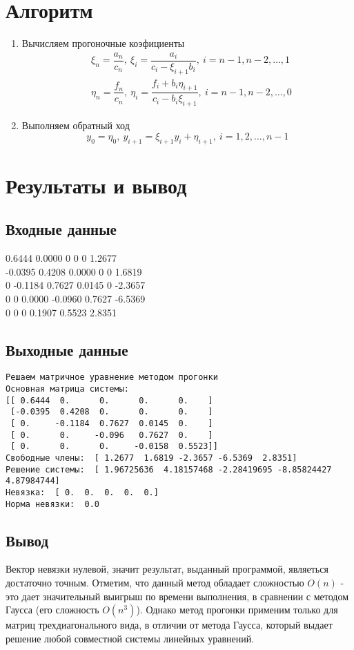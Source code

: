 \documentclass[11.4pt]{article}
\begin{document}
\section{Алгоритм}
\begin{enumerate}
	\item Вычисляем прогоночные коэфициенты
		\begin{equation*}
			\begin{aligned}
				&\xi_n = \dfrac{a_n}{c_n}, \: \xi_i = \dfrac{a_i}{c_i-\xi_{i+1}b_i}, \: i=n-1, n-2,\ldots, 1\\
				&\eta_n = \dfrac{f_n}{c_n}, \: \eta_i = \dfrac{f_i + b_i\eta_{i+1}}{c_i - b_i\xi_{i+1}}, \: i = n-1,n-2,\ldots,0
			\end{aligned}
		\end{equation*}
	\item Выполняем обратный ход \[y_0=\eta_0, \: y_{i+1} = \xi_{i+1}y_i + \eta_{i+1}, \: i=1,2,\ldots,n-1\]
\end{enumerate}
\section{Результаты и вывод}
	\subsection{Входные данные}
		0.6444 0.0000 0 0 0 1.2677\\
		-0.0395 0.4208 0.0000 0 0 1.6819\\
		0 -0.1184 0.7627 0.0145 0 -2.3657\\
		0 0 0.0000 -0.0960 0.7627 -6.5369\\
		0 0 0 0.1907 0.5523 2.8351
	\subsection{Выходные данные}
\begin{verbatim}
Решаем матричное уравнение методом прогонки
Основная матрица системы:
[[ 0.6444  0.      0.      0.      0.    ]
 [-0.0395  0.4208  0.      0.      0.    ]
 [ 0.     -0.1184  0.7627  0.0145  0.    ]
 [ 0.      0.     -0.096   0.7627  0.    ]
 [ 0.      0.      0.     -0.0158  0.5523]]
Свободные члены:  [ 1.2677  1.6819 -2.3657 -6.5369  2.8351]
Решение системы:  [ 1.96725636  4.18157468 -2.28419695 -8.85824427  4.87984744]
Невязка:  [ 0.  0.  0.  0.  0.]
Норма невязки:  0.0
 \end{verbatim}
	\subsection{Вывод}
		Вектор невязки нулевой, значит результат, выданный программой, являеться достаточно точным. Отметим, что данный метод обладает сложностью  $O(n)$ - это дает значительный выигрыш по времени выполнения, в сравнении с методом Гаусса (его сложность $O(n^3)$). Однако метод прогонки применим только для матриц трехдиагонального вида, в отличии от метода Гаусса, который выдает решение любой совместной системы линейных уравнений.
\end{document}
